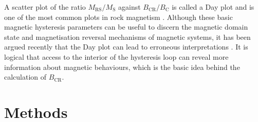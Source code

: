 A scatter plot of the ratio $M_{\text{RS}}/M_{\text{S}}$ against $B_{\text{CR}}/B_{\text{C}}$ is called a Day plot \citep{Day1977} and is one of the most common plots in rock magnetism \citep{Dunlop}. Although these basic magnetic hysteresis parameters can be useful to discern the magnetic domain state and magnetisation reversal mechanisms of magnetic systems, it has been argued recently that the Day plot can lead to erroneous interpretations \citep{Egli2014,Roberts2017}. It is logical that access to the interior of the hysteresis loop can reveal more information about magnetic behaviours, which is the basic idea behind the calculation of $B_{\text{CR}}$.\par

\section{Methods}
